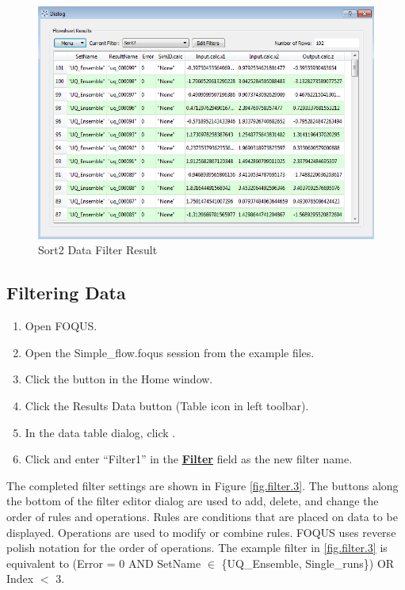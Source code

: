 \begin{figure}[H]
	\begin{center}
		\includegraphics[scale=0.55]{Chapt_flowsheet/figs/filter_2_result}
		\caption{Sort2 Data Filter Result}
		\label{fig.filter.2.result}
	\end{center}
\end{figure}

\subsection{Filtering Data}

\begin{enumerate}
	\item Open FOQUS.
	\item Open the Simple\_flow.foqus session from the example files.
	\item Click the  button in the Home window.
	\item Click the Results Data button (Table icon in left toolbar).
	\item In the data table dialog, click .
	\item Click  and enter ``Filter1'' in the \textbf{\underline{Filter}} field as the new filter name.
\end{enumerate}

The completed filter settings are shown in Figure \ref{fig.filter.3}. The buttons along the bottom of the filter editor dialog are used to add, delete, and change the order of rules and operations. Rules are conditions that are placed on data to be displayed. Operations are used to modify or combine rules. FOQUS uses reverse polish notation for the order of operations. The example filter in \ref{fig.filter.3} is equivalent to (Error = 0 AND SetName $\in$ \{UQ\_Ensemble, Single\_runs\}) OR Index $<$ 3.

